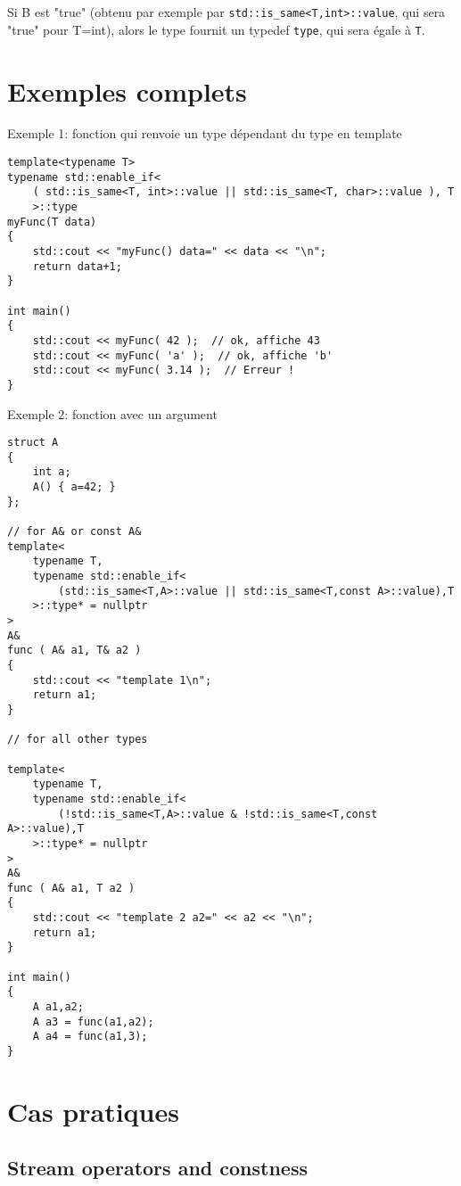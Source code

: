 \documentclass[11pt,a4paper]{article}
\begin{document}
Si B est "true" (obtenu par exemple par {\tt std::is\_same<T,int>::value}, qui sera "true" pour T=int), alors le type fournit un typedef {\tt type}, qui sera égale à {\tt T}.


\section{Exemples complets}


Exemple 1: fonction qui renvoie un type dépendant du type en template

\begin{lstlisting}
template<typename T>
typename std::enable_if<
	( std::is_same<T, int>::value || std::is_same<T, char>::value ), T
	>::type
myFunc(T data)
{
	std::cout << "myFunc() data=" << data << "\n";
	return data+1;
}

int main()
{
    std::cout << myFunc( 42 );  // ok, affiche 43
    std::cout << myFunc( 'a' );  // ok, affiche 'b'
    std::cout << myFunc( 3.14 );  // Erreur !        
}
\end{lstlisting}



Exemple 2: fonction avec un argument

\begin{lstlisting}
struct A
{
    int a;
    A() { a=42; }
};

// for A& or const A&
template<
	typename T,
	typename std::enable_if<
		(std::is_same<T,A>::value || std::is_same<T,const A>::value),T
	>::type* = nullptr
> 
A&
func ( A& a1, T& a2 )
{
    std::cout << "template 1\n";
    return a1;
}

// for all other types

template<
	typename T,
	typename std::enable_if<
		(!std::is_same<T,A>::value & !std::is_same<T,const A>::value),T
	>::type* = nullptr
> 
A&
func ( A& a1, T a2 )
{
    std::cout << "template 2 a2=" << a2 << "\n";
    return a1;
}
 
int main()
{
    A a1,a2;
    A a3 = func(a1,a2);
    A a4 = func(a1,3);
}
\end{lstlisting}

\section{Cas pratiques}

\subsection{Stream operators and constness}
\end{document}
